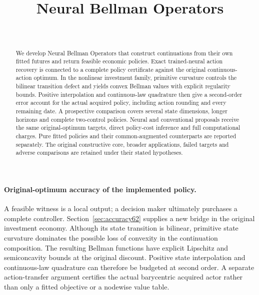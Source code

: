 \documentclass[ecta,nameyear,draft]{econsocart}
\begin{document}
\begin{frontmatter}
\title{Neural Bellman Operators}
\begin{aug}
\author[id=au1,addressref={add1}]{~}
\address[id=add1]{Peking University}
\end{aug}
\begin{abstract}
We develop Neural Bellman Operators that construct continuations from their own fitted futures and return feasible economic policies. Exact trained-neural action recovery is connected to a complete policy certificate against the original continuous-action optimum. In the nonlinear investment family, primitive curvature controls the bilinear transition defect and yields convex Bellman values with explicit regularity bounds. Positive interpolation and continuous-law quadrature then give a second-order error account for the actual acquired policy, including action rounding and every remaining date. A prospective comparison covers several state dimensions, longer horizons and complete two-control policies. Neural and conventional proposals receive the same original-optimum targets, direct policy-cost inference and full computational charges. Pure fitted policies and their common-augmented counterparts are reported separately. The original constructive core, broader applications, failed targets and adverse comparisons are retained under their stated hypotheses.
\end{abstract}
\begin{keyword}
\end{keyword}
\end{frontmatter}

\paragraph{Original-optimum accuracy of the implemented policy.}
A feasible witness is a local output; a decision maker ultimately purchases a complete controller. Section~\ref{sec:accuracy62} supplies a new bridge in the original investment economy. Although its state transition is bilinear, primitive state curvature dominates the possible loss of convexity in the continuation composition. The resulting Bellman functions have explicit Lipschitz and semiconcavity bounds at the original discount. Positive state interpolation and continuous-law quadrature can therefore be budgeted at second order. A separate action-transfer argument certifies the actual barycentric acquired actor rather than only a fitted objective or a nodewise value table.
\end{document}
